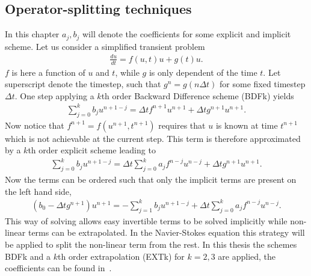 \subsection{Operator-splitting techniques } \label{opsplitting}
In this chapter $a_j,b_j$ will denote the coefficients for some explicit and implicit scheme.
Let us consider a simplified transient problem 
\begin{align}
    \frac{du}{dt} = f(u,t)u + g(t)u.
    \label{eq:testproblem}
\end{align}
$f$ is here a function of $u$ and $t$, while $g$ is only dependent of the time $t$. Let superscript denote the timestep, 
such that $g^{n}=g(n\Delta t)$ for some fixed timestep $\Delta t$. One step applying a $k$th order
Backward Difference scheme (BDFk) yields
%
\begin{align}
    \sum_{j = 0}^{k} b_j u^{n+1-j} =\Delta tf^{n+1}u^{n+1}+\Delta tg^{n+1}u^{n+1}.
    \label{eq:imp}
\end{align}
%
Now notice that $f^{n+1}=f(u^{n+1},t^{n+1})$ requires that $u$ is known at time $t^{n+1}$ which is not achievable at the current 
step. This term is therefore approximated by a $k$th order explicit scheme leading to 
%
\begin{align}
    \sum_{j = 0}^{k} b_j u^{n+1-j} =\Delta t\sum_{j = 0}^{k} a_j f^{n-j}u^{n-j}+\Delta tg^{n+1}u^{n+1}.
    \label{eq:imp-exp}
\end{align}
%
Now the terms can be ordered such that only the implicit terms are present on the left hand side, 
%
\begin{align}
    (b_0-\Delta tg^{n+1})u^{n+1} =-\sum_{j = 1}^{k} b_j u^{n+1-j}+\Delta t\sum_{j = 0}^{k} a_j f^{n-j}u^{n-j}.
    \label{eq:imp-exp-ord}
\end{align}
%
This way of solving  allows easy invertible terms to be solved implicitly while non-linear terms can be extrapolated.
In the Navier-Stokes equation this strategy will be applied to split the non-linear term from the rest.
In this thesis the schemes BDFk and a $k$th order extrapolation (EXTk) for $k=2,3$ are applied, the coefficients can be found in~\cite{Nek}. 

